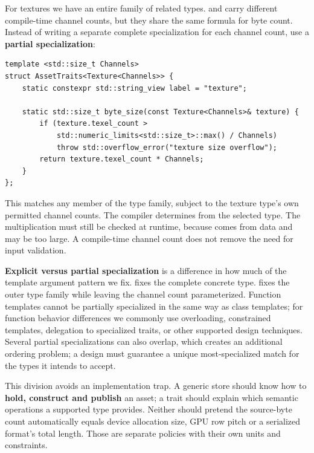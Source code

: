 For textures we have an entire family of related types.  and  carry different compile-time channel counts, but they share the same formula for byte count. Instead of writing a separate complete specialization for each channel count, use a \textbf{partial specialization}:

\begin{verbatim}
template <std::size_t Channels>
struct AssetTraits<Texture<Channels>> {
    static constexpr std::string_view label = "texture";

    static std::size_t byte_size(const Texture<Channels>& texture) {
        if (texture.texel_count >
            std::numeric_limits<std::size_t>::max() / Channels)
            throw std::overflow_error("texture size overflow");
        return texture.texel_count * Channels;
    }
};
\end{verbatim}

This matches any member of the  type family, subject to the texture type's own permitted channel counts. The compiler determines  from the selected  type. The multiplication must still be checked at runtime, because  comes from data and may be too large. A compile-time channel count does not remove the need for input validation.

\textbf{Explicit versus partial specialization} is a difference in how much of the template argument pattern we fix.  fixes the complete concrete type.  fixes the outer type family while leaving the channel count parameterized. Function templates cannot be partially specialized in the same way as class templates; for function behavior differences we commonly use overloading, constrained templates, delegation to specialized traits, or other supported design techniques. Several partial specializations can also overlap, which creates an additional ordering problem; a design must guarantee a unique most-specialized match for the types it intends to accept.

This division avoids an implementation trap. A generic store should know how to \textbf{hold, construct and publish} an asset; a trait should explain which semantic operations a supported type provides. Neither should pretend the source-byte count automatically equals device allocation size, GPU row pitch or a serialized format's total length. Those are separate policies with their own units and constraints.

